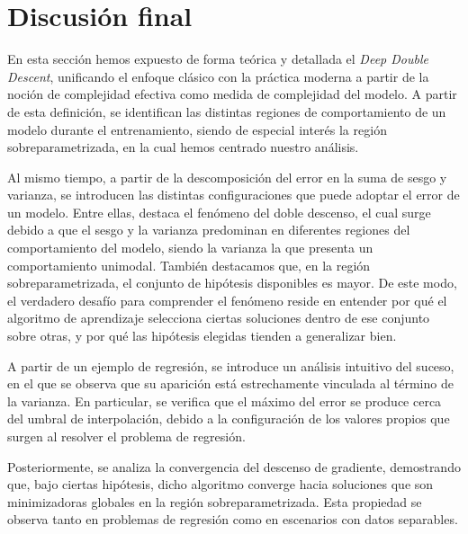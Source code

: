 \section{Discusión final}\label{sec:conclusion-matematica}

En esta sección hemos expuesto de forma teórica y detallada el \textit{Deep Double Descent}, unificando el enfoque clásico con la práctica moderna a partir de la noción de complejidad efectiva como medida de complejidad del modelo. A partir de esta definición, se identifican las distintas regiones de comportamiento de un modelo durante el entrenamiento, siendo de especial interés la región sobreparametrizada, en la cual hemos centrado nuestro análisis.\newline

Al mismo tiempo, a partir de la descomposición del error en la suma de sesgo y varianza, se introducen las distintas configuraciones que puede adoptar el error de un modelo. Entre ellas, destaca el fenómeno del doble descenso, el cual surge debido a que el sesgo y la varianza predominan en diferentes regiones del comportamiento del modelo, siendo la varianza la que presenta un comportamiento unimodal. También destacamos que, en la región sobreparametrizada, el conjunto de hipótesis disponibles es mayor. De este modo, el verdadero desafío para comprender el fenómeno reside en entender por qué el algoritmo de aprendizaje selecciona ciertas soluciones dentro de ese conjunto sobre otras, y por qué las hipótesis elegidas tienden a generalizar bien.\newline

A partir de un ejemplo de regresión, se introduce un análisis intuitivo del suceso, en el que se observa que su aparición está estrechamente vinculada al término de la varianza. En particular, se verifica que el máximo del error se produce cerca del umbral de interpolación, debido a la configuración de los valores propios que surgen al resolver el problema de regresión.\newline

Posteriormente, se analiza la convergencia del descenso de gradiente, demostrando que, bajo ciertas hipótesis, dicho algoritmo converge hacia soluciones que son minimizadoras globales en la región sobreparametrizada. Esta propiedad se observa tanto en problemas de regresión como en escenarios con datos separables.\newline

